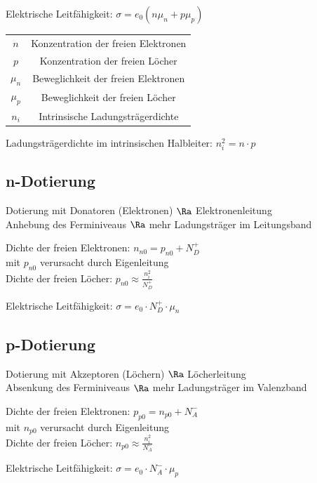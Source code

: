 \documentclass[german]{latex4ei_fs}
\begin{document}
\begin{sectionbox}
Elektrische Leitfähigkeit:
$\sigma = e_0 (n \mu_n + p \mu_p)$

\begin{symbolbox}
\begin{tabular}{cc}
$n$ & Konzentration der freien Elektronen \\
$p$ & Konzentration der freien Löcher \\
$\mu_n$ & Beweglichkeit der freien Elektronen \\
$\mu_p$ & Beweglichkeit der freien Löcher \\
$n_i$ & Intrinsische Ladungsträgerdichte
 \end{tabular}
\end{symbolbox}

Ladungsträgerdichte im intrinsischen Halbleiter:
 $n_i^2 = n \cdot p$
\end{sectionbox}
\begin{sectionbox}
 \subsection{n-Dotierung}
 Dotierung mit Donatoren (Elektronen) $\Ra$ Elektronenleitung \\

Anhebung des Ferminiveaus $\Ra$ mehr Ladungsträger im Leitungsband

Dichte der freien Elektronen: $n_{n0} = p_{n0} + N_D^+$ \\
mit $p_{n0}$ verursacht durch Eigenleitung \\

Dichte der freien Löcher: $p_{n0} \approx \frac{n_i^2}{N_D^+}$

Elektrische Leitfähigkeit: $\sigma = e_0 \cdot N_D^+ \cdot \mu_n$
\end{sectionbox}
\begin{sectionbox}

 \subsection{p-Dotierung}
Dotierung mit Akzeptoren (Löchern) $\Ra$ Löcherleitung \\

Absenkung des Ferminiveaus $\Ra$ mehr Ladungsträger im Valenzband

Dichte der freien Elektronen: $p_{p0} = n_{p0} + N_A^-$ \\
mit $n_{p0}$ verursacht durch Eigenleitung \\

Dichte der freien Löcher: $n_{p0} \approx \frac{n_i^2}{N_A^-}$

Elektrische Leitfähigkeit: $\sigma = e_0 \cdot N_A^- \cdot \mu_p$

\end{sectionbox}
\end{document}
